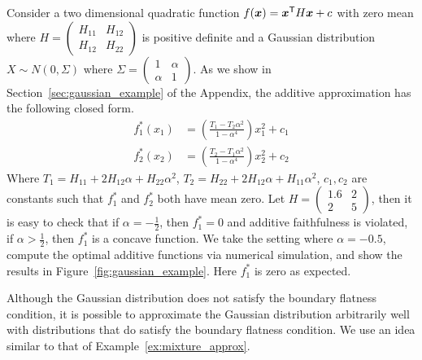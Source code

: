 \begin{example}
\label{examp:gaussian_counterexample}
Consider a two dimensional quadratic function $f( \mbox{\boldmath $x$}) = \mbox{\boldmath $x$}^{\mathsf{T}} H \mbox{\boldmath $x$} + c$ with zero mean where $H = \begin{pmatrix} H_{11} & H_{12} \\ H_{12} & H_{22}\end{pmatrix}$ is positive definite and a Gaussian distribution $X \sim N(0, \Sigma)$ where $\Sigma = \begin{pmatrix}1 & \alpha \\ \alpha & 1 \end{pmatrix}$.
As we show in Section~\ref{sec:gaussian_example} of the Appendix, the additive approximation has the
following closed form.
\begin{align*}
f^*_1(x_1) &= \left( \frac{T_1 - T_2 \alpha^2}{1 - \alpha^4} \right) x_1^2 + c_1\\
f^*_2(x_2) &= \left( \frac{T_2 - T_1 \alpha^2}{1 - \alpha^4} \right) x_2^2 + c_2
\end{align*}
Where $T_1 = H_{11} + 2H_{12} \alpha + H_{22} \alpha^2$, $T_2 = H_{22}
+ 2H_{12} \alpha + H_{11} \alpha^2$, $c_1, c_2$ are constants such
that $f^*_1$ and $f^*_2$ both have mean zero. Let $H = \begin{pmatrix}
  1.6 & 2 \\ 2 & 5\end{pmatrix}$, then it is easy to check that if
  $\alpha = - \frac{1}{2}$, then $f^*_1 = 0$ and additive faithfulness
  is violated, if $\alpha > \frac{1}{2}$, then $f^*_1$ is a concave
  function. We take the setting where $\alpha=-0.5$, compute the
  optimal additive functions via numerical simulation, and show the
  results in Figure~\ref{fig:gaussian_example}.  Here $f^*_1$ is zero as
  expected.
\end{example}

Although the Gaussian distribution does not satisfy the boundary
flatness condition, it is possible to approximate the Gaussian
distribution arbitrarily well with distributions that do satisfy the
boundary flatness condition. We use an idea similar to that of
Example~\ref{ex:mixture_approx}.

